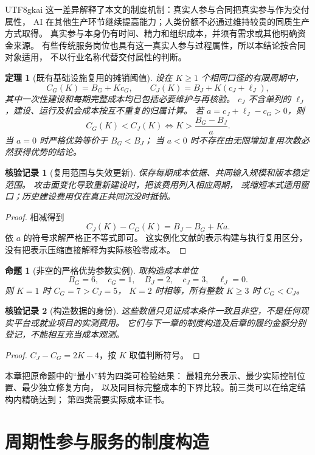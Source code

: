 \documentclass[12pt,a4paper,openany]{report}
\newtheorem{theorem}{定理}[chapter]
\newtheorem{proposition}{命题}[chapter]
\newtheorem{Certificate}{核验记录}[chapter]
\begin{document}
\begin{CJK*}{UTF8}{gkai}
这一差异解释了本文的制度机制：真实人参与合同把真实参与作为交付属性，
AI 在其他生产环节继续提高能力；人类份额不必通过维持较贵的同质生产方式取得。
真实参与本身仍有时间、精力和组织成本，并须有需求或其他明确资金来源。
有些传统服务岗位也具有这一真实人参与过程属性，所以本结论按合同对象适用，
不以行业名称代替交付属性的判断。

\begin{theorem}[既有基础设施复用的摊销阈值]
\label{thm:amortized}
设在 \(K\ge1\) 个相同口径的有限周期中，
\[
C_G(K)=B_G+Kc_G,\qquad
C_J(K)=B_J+K(c_J+\ell_J),
\]
其中一次性建设和每期完整成本均已包括必要维护与再核验。
\(c_J\) 不含单列的 \(\ell_J\)，建设、运行及机会成本按互不重复的归属计算。
若 \(a=c_J+\ell_J-c_G>0\)，则
\[
C_G(K)<C_J(K)
\Longleftrightarrow K>\frac{B_G-B_J}{a}.
\]
当 \(a=0\) 时严格优势等价于 \(B_G<B_J\)；
当 \(a<0\) 时不存在由无限增加复用次数必然获得优势的结论。
\end{theorem}
\begin{Certificate}[复用范围与失效更新]
保存每期成本依据、共同输入规模和版本稳定范围。
攻击面变化导致重新建设时，把该费用列入相应周期，
或缩短本式适用窗口；历史建设费用仅在真正共同沉没时抵销。
\end{Certificate}
\begin{proof}
相减得到
\[
C_J(K)-C_G(K)=B_J-B_G+Ka.
\]
依 \(a\) 的符号求解严格正不等式即可。
这实例化文献\cite{GRate}的表示构建与执行复用区分，
没有把表示压缩直接解释为实际核验零成本。
\end{proof}

\begin{proposition}[非空的严格优势参数实例]
取构造成本单位
\[
B_G=6,\quad c_G=1,\quad B_J=2,\quad c_J=3,\quad\ell_J=0.
\]
则 \(K=1\) 时 \(C_G=7>C_J=5\)，
\(K=2\) 时相等，所有整数 \(K\ge3\) 时 \(C_G<C_J\)。
\end{proposition}
\begin{Certificate}[构造数据的身份]
这些数值只见证成本条件一致且非空，不是任何现实平台或就业项目的实测费用。
它们与下一章的制度构造及后章的履约金额分别登记，不能相互充当成本观测。
\end{Certificate}
\begin{proof}
\(C_J-C_G=2K-4\)，按 \(K\) 取值判断符号。
\end{proof}

本章把原命题中的“最小”转为四类可检验结果：
最粗充分表示、最少实际控制位置、最少独立修复方向，
以及同目标完整成本的下界比较。前三类可以在给定结构内精确达到；
第四类需要实际成本证书。

\chapter{周期性参与服务的制度构造}
\label{ch:service-cycle}


\end{CJK*}
\end{document}
